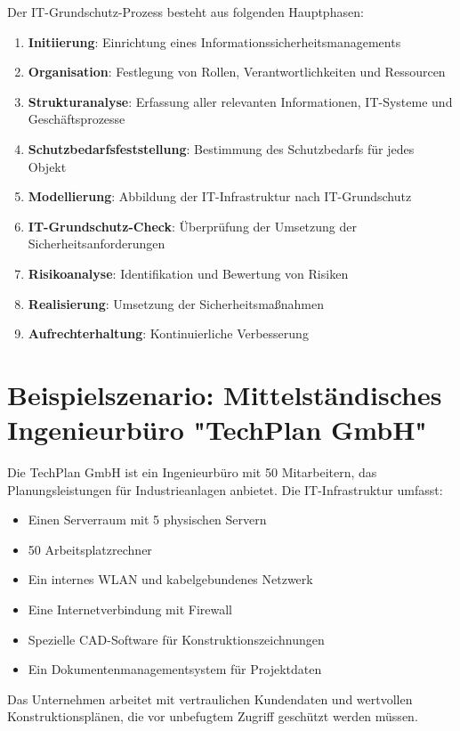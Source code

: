 \documentclass{orgstandard}
\begin{document}
Der IT-Grundschutz-Prozess besteht aus folgenden Hauptphasen:
\begin{enumerate}
\item \textbf{Initiierung}: Einrichtung eines Informationssicherheitsmanagements
\item \textbf{Organisation}: Festlegung von Rollen, Verantwortlichkeiten und Ressourcen
\item \textbf{Strukturanalyse}: Erfassung aller relevanten Informationen, IT-Systeme und Geschäftsprozesse
\item \textbf{Schutzbedarfsfeststellung}: Bestimmung des Schutzbedarfs für jedes Objekt
\end{enumerate}
\begin{enumerate}
\setcounter{enumi}{4}
\item \textbf{Modellierung}: Abbildung der IT-Infrastruktur nach IT-Grundschutz
\item \textbf{IT-Grundschutz-Check}: Überprüfung der Umsetzung der Sicherheitsanforderungen
\item \textbf{Risikoanalyse}: Identifikation und Bewertung von Risiken
\item \textbf{Realisierung}: Umsetzung der Sicherheitsmaßnahmen
\item \textbf{Aufrechterhaltung}: Kontinuierliche Verbesserung
\end{enumerate}

\section{Beispielszenario: Mittelständisches Ingenieurbüro "TechPlan GmbH"}
\label{sec:orgadda242}


Die TechPlan GmbH ist ein Ingenieurbüro mit 50 Mitarbeitern, das Planungsleistungen für Industrieanlagen anbietet. Die IT-Infrastruktur umfasst:
\begin{itemize}
\item Einen Serverraum mit 5 physischen Servern
\item 50 Arbeitsplatzrechner
\item Ein internes WLAN und kabelgebundenes Netzwerk
\item Eine Internetverbindung mit Firewall
\item Spezielle CAD-Software für Konstruktionszeichnungen
\item Ein Dokumentenmanagementsystem für Projektdaten
\end{itemize}

Das Unternehmen arbeitet mit vertraulichen Kundendaten und wertvollen Konstruktionsplänen, die vor unbefugtem Zugriff geschützt werden müssen.
\end{document}
